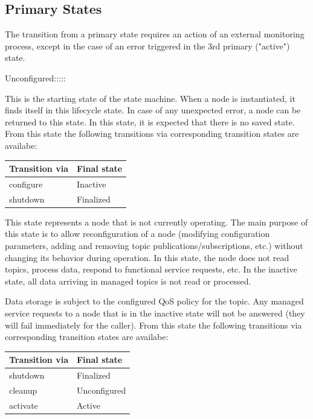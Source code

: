 	\subsection{Primary States}	
	The transition from a primary state requires an action of an external monitoring process, except in the case of an error triggered in the 3rd primary ("active") state.
	\begin{labeling}{Unconfigured:::::}
		\item[\textbf{Unconfigured}] This is the starting state of the state machine. When a node is instantiated, it finds itself in this lifecycle state. In case of any unexpected error, a node can be returned to this state. In this state, it is expected that there is no saved state. From this state the following transitions via corresponding transition states are availabe:
		\begin{table}[H]
			\centering
			\label{tab:Valid transitions}
			\begin{tabular}{|p{3cm}|p{3cm}|}
				\toprule
				Transition via & Final state\\
				\midrule
				configure & Inactive  \\
				shutdown & Finalized \\
				\bottomrule
			\end{tabular}
		\end{table}

		\item[\textbf{Inactive}] This state represents a node that is not currently operating. The main purpose of this state is to allow reconfiguration of a node (modifying configuration parameters, adding and removing topic publications/subscriptions, etc.) without changing its behavior during operation. In this state, the node does not read topics, process data, respond to functional service requests, etc. In the inactive state, all data arriving in managed topics is not read or processed. 
		
		Data storage is subject to the configured QoS policy for the topic. Any managed service requests to a node that is in the inactive state will not be answered (they will fail immediately for the caller). From this state the following transitions via corresponding transition states are availabe:
		\begin{table}[H]
			\centering
			\label{tab:Valid transitions}
			\begin{tabular}{|p{3cm}|p{3cm}|}
				\toprule
				Transition via & Final state\\
				\midrule
				shutdown & Finalized  \\
				cleanup & Unconfigured \\
				activate & Active \\
				\bottomrule
			\end{tabular}
		\end{table}


\end{labeling}
